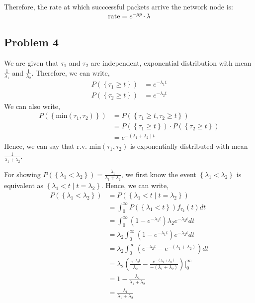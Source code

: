 \documentclass{article}
\begin{document}
		Therefore, the rate at which succcessful packets arrive the network node is:
		\begin{align*}
			\text{rate} = e^{-\mu p} \cdot \lambda
		\end{align*}

	\subsection*{Problem 4}

		We are given that $\tau_{1}$ and $\tau_{2}$ are independent, exponential
		distribution with mean $\frac{1}{\lambda_{1}}$ and $\frac{1}{\lambda_{2}}$.
		Therefore, we can write,
		\begin{align*}
			P(\left\{ \tau_{1}  \geqslant t \right\}) &= e^{-\lambda_{1} t} \\
			P(\left\{ \tau_{2}  \geqslant t \right\}) &= e^{-\lambda_{2} t}
		\end{align*}
		We can also write,
		\begin{align*}
			P(\left\{ \text{min}(\tau_{1}, \tau_{2}) \right\}) &= P(\left\{ \tau_{1} \geqslant t, \tau_{2} \geqslant t  \right\}) \\
			&= P(\left\{ \tau_{1} \geqslant t \right\}) \cdot P(\left\{ \tau_{2} \geqslant t \right\}) \\
			&= e^{-(\lambda_{1} + \lambda_{2})t}
		\end{align*}
		Hence, we can say that r.v. min$(\tau_{1}, \tau_{2})$ is exponentially
		distributed with mean $\frac{1}{\lambda_{1} + \lambda_{2}}$.

		For showing $P(\left\{ \lambda_{1} < \lambda_{2} \right\}) = \frac{\lambda_{1}}{\lambda_{1} + \lambda_{2}}$,
		we first know the event $\left\{ \lambda_{1} < \lambda_{2} \right\}$ is
		equivalent as $\left\{ \lambda_{1} < t \mid t = \lambda_{2} \right\}$. Hence,
		we can write,
		\begin{align*}
			P(\left\{ \lambda_{1} < \lambda_{2} \right\}) &= P(\left\{ \lambda_{1} < t \mid t = \lambda_{2} \right\}) \\
			&= \int_{0}^{\infty} P(\left\{ \lambda_{1} < t \right\}) f_{\tau_{2}}(t)dt \\
			&= \int_{0}^{\infty} (1 - e^{-\lambda_{1}t}) \lambda_{2}e^{-\lambda_{2}t}dt \\
			&= \lambda_{2} \int_{0}^{\infty} (1 - e^{-\lambda_{1}t}) e^{-\lambda_{2}t}dt \\
			&= \lambda_{2} \int_{0}^{\infty} (e^{-\lambda_{2}t} - e^{-(\lambda_{1} + \lambda_{2})})dt \\
			&= \lambda_{2} (\frac{e^{-\lambda_{2}t}}{\lambda_{2}} - \frac{e^{-(\lambda_{1} + \lambda_{2})}}{-(\lambda_{1} + \lambda_{2})}) \bigg|_{0}^{\infty} \\
			&= 1 - \frac{\lambda_{2}}{\lambda_{1} + \lambda_{2}} \\
			&= \frac{\lambda_{1}}{\lambda_{1} + \lambda_{2}}
		\end{align*} 
\end{document}
